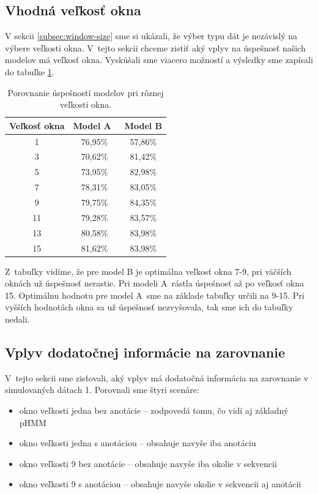 \subsection{Vhodná veľkosť okna}

V sekcii \ref{subsec:window-size} sme si ukázali, že výber typu dát je nezávislý na výbere veľkosti okna. V~tejto sekcii chceme zistiť aký vplyv na úspešnosť našich modelov má veľkosť okna.
Vyskúšali sme viacero možností a výsledky sme zapísali do tabuľke \ref{tab:window-compare}.

\begin{table}[htp]
\centering
\begin{tabular}{ccc}
\toprule
Veľkosť okna & Model A~& Model B\\
\midrule
1 & 76,95\% & 57,86\%\\
3 & 70,62\% & 81,42\%\\
5 & 73,95\% & 82,98\%\\
7 & 78,31\% & 83,05\%\\
9 & 79,75\% & 84,35\%\\
11 & 79,28\% & 83,57\%\\
13 & 80,58\% & 83,98\%\\
15 & 81,62\% & 83,98\%\\
\bottomrule
\end{tabular}
\caption[Porovnanie úspešností pri rôznej veľkosti okna]{Porovnanie úspešností modelov pri rôznej veľkosti okna.}
\label{tab:window-compare}
\end{table}

Z~tabuľky vidíme, že pre model B je optimálna veľkosť okna 7-9, pri väčších oknách už úspešnosť nerastie. Pri modeli A~rástla úspešnosť až po veľkosť okna 15. Optimálnu hodnotu pre model A~sme na základe tabuľky určili na 9-15. Pri vyšších hodnotách okna sa už úspešnosť nezvyšovala, tak sme ich do tabuľky nedali.

\subsection{Vplyv dodatočnej informácie na zarovnanie}

V~tejto sekcii sme zisťovali, aký vplyv má dodatočná informácia na zarovnanie v simulovaných dátach 1. Porovnali sme štyri scenáre:
\begin{itemize}
    \item okno veľkosti jedna bez anotácie -- zodpovedá tomu, čo vidí aj základný pHMM
    \item okno veľkosti jedna s anotáciou -- obsahuje navyše iba anotáciu
    \item okno veľkosti 9 bez anotácie -- obsahuje navyše iba okolie v sekvencii
    \item okno veľkosti 9 s anotáciou -- obsahuje navyše okolie v sekvencii aj anotácii
\end{itemize}

